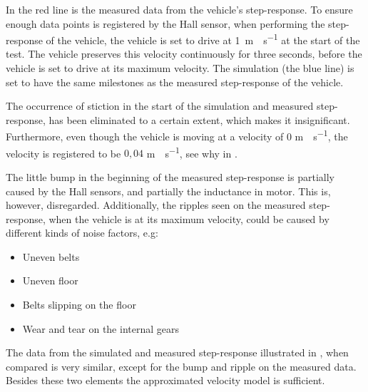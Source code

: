 %
In  the red line is the measured data from the vehicle's step-response. To ensure enough data points is registered by the Hall sensor, when performing the step-response of the vehicle, the vehicle is set to drive at \si{1 m\cdot s^{-1}} at the start of the test. The vehicle preserves this velocity continuously for three seconds, before the vehicle is set to drive at its maximum velocity. The simulation (the blue line) is set to have the same milestones as the measured step-response of the vehicle. 

The occurrence of stiction in the start of the simulation and measured step-response, has been eliminated to a certain extent, which makes it insignificant. Furthermore, even though the vehicle is moving at a velocity of $0$ \si{m \cdot s^{-1}}, the velocity is registered to be $0,04$ \si{m \cdot s^{-1}}, see why in . 

The little bump in the beginning of the measured step-response is partially caused by the Hall sensors, and partially the inductance in motor. This is, however, disregarded. Additionally, the ripples seen on the measured step-response, when the vehicle is at its maximum velocity, could be caused by different kinds of noise factors, e.g:

\begin{itemize}
\item Uneven belts
\item Uneven floor
\item Belts slipping on the floor
\item Wear and tear on the internal gears
\end{itemize}

The data from the simulated and measured step-response illustrated in , when compared is very similar, except for the bump and ripple on the measured data. Besides these two elements the approximated velocity model is sufficient.